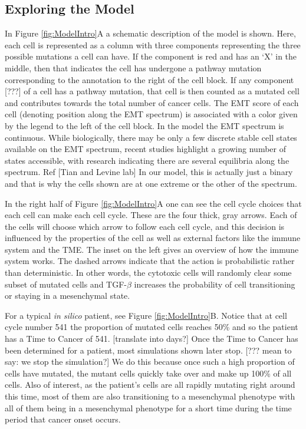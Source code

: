 \documentclass{article}
\begin{document}
\subsection{Exploring the Model}\label{ExplModel}
In Figure \ref{fig:ModelIntro}A a schematic description of the model is shown.
Here, each cell is represented as a column with three components representing the three possible mutations a cell can have.
If the component is red and has an `X' in the middle, then that indicates the cell has undergone a pathway mutation corresponding to the annotation to the right of the cell block.
If any component [???] of a cell has a pathway mutation, that cell is then counted as a mutated cell and contributes towards the total number of cancer cells.
The EMT score of each cell (denoting position along the EMT spectrum) is associated with a color given by the legend to the left of the cell block. 
In the model the EMT spectrum is continuous. While biologically, there may be only a few discrete stable cell states available on the EMT spectrum, recent studies highlight a growing number of states accessible, with research indicating there are several equilibria along the spectrum. Ref [Tian and Levine lab] 
In our model, this is actually just a binary and that is why the cells shown are at one extreme or the other of the spectrum.

In the right half of Figure \ref{fig:ModelIntro}A one can see the cell cycle choices that each cell can make each cell cycle.
These are the four thick, gray arrows.
Each of the cells will choose which arrow to follow each cell cycle, and this decision is influenced by the properties of the cell as well as external factors like the immune system and the TME.
The inset on the left gives an overview of how the immune system works.
The dashed arrows indicate that the action is probabilistic rather than deterministic.
In other words, the cytotoxic cells will randomly clear some subset of mutated cells and TGF-$\beta$ increases the probability of cell transitioning or staying in a mesenchymal state.

For a typical {\it in silico} patient, see Figure \ref{fig:ModelIntro}B.
Notice that at cell cycle number 541 the proportion of mutated cells reaches 50\% and so the patient has a Time to Cancer of 541. [translate into days?]
Once the Time to Cancer has been determined for a patient, most simulations shown later stop. [??? mean to say: we stop the simulation?]
We do this because once such a high proportion of cells have mutated, the mutant cells quickly take over and make up 100\% of all cells.
Also of interest, as the patient's cells are all rapidly mutating right around this time, most of them are also transitioning to a mesenchymal phenotype with all of them being in a mesenchymal phenotype for a short time during the time period that cancer onset occurs.
\end{document}
